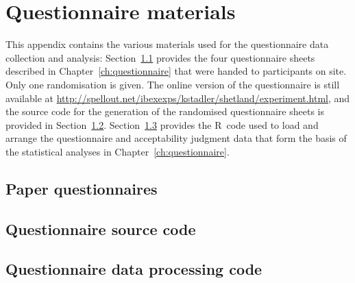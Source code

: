 \documentclass[twoside,10pt]{book}
\newcommand{\includeR}[1]{}
\begin{document}
\chapter{Questionnaire materials}
\label{app:questionnaire}
This appendix contains the various materials used for the questionnaire data collection and analysis: Section~\ref{app:paperquestionnaire} provides the four questionnaire sheets described in Chapter~\ref{ch:questionnaire} that were handed to participants on site. Only one randomisation is given. The online version of the questionnaire is still available at \url{http://spellout.net/ibexexps/kstadler/shetland/experiment.html}, and the source code %
for the generation of the randomised questionnaire sheets is provided in Section~\ref{app:questionnairecode}.
Section~\ref{app:questionnairedatacode} provides the R~code used to load and arrange the questionnaire and acceptability judgment data that form the basis of the statistical analyses in Chapter~\ref{ch:questionnaire}.

\section{Paper questionnaires}
\label{app:paperquestionnaire}
%
\section{Questionnaire source code}
\label{app:questionnairecode}

\includeR{questionnaire/data/questionnaire.Rmd}


\section{Questionnaire data processing code}
\label{app:questionnairedatacode}

\includeR{questionnaire/data/shetland-data.R}
\end{document}
